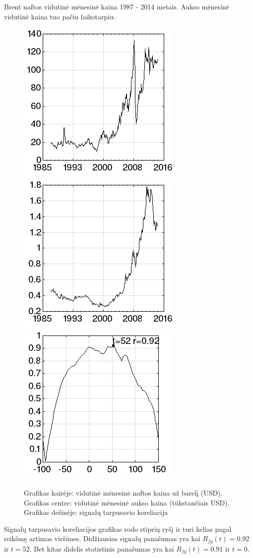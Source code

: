 Brent naftos vidutinė mėnesinė kaina\cite{oil} 1987 - 2014 metais.
Aukso mėnesinė vidutinė kaina\cite{gold} tuo pačiu laikotarpiu.

\begin{figure}
\includegraphics[scale=0.65]{../scripts/oil_gold/oil.png}
\includegraphics[scale=0.65]{../scripts/oil_gold/gold.png}
\includegraphics[scale=0.65]{../scripts/oil_gold/result.png}
    \caption{Grafikas kairėje: vidutinė mėnesinė naftos kaina už barelį (USD). Grafikas centre: vidutinė mėnesinė aukso kaina (tūkstančiais USD). Grafikas dešinėje: signalų tarpusavio koreliacija}
\end{figure}


Signalų tarpusavio koreliacijos grafikas rodo stiprių ryšį ir turi kelias pagal reikšmę artimas viršūnes.
Didžiausias signalų panašumas yra kai \( R_{fg}(t) = 0.92 \) ir \( t = 52 \).
Bet kitas didelis statistinis panašumas yra kai \( R_{fg}(t) = 0.91 \) ir \( t = 0 \).
